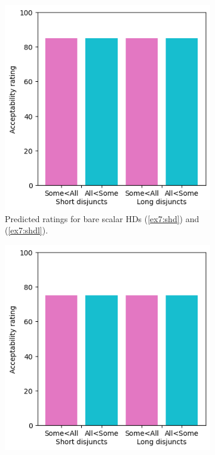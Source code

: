 \begin{figure}[H]
	\centering
	\begin{subfigure}[t]{.32\linewidth}
		\centering
		\includegraphics[width=\linewidth]{./pred-1a-noonly.png}
		\caption[]{Predicted ratings for bare scalar HDs (\ref{ex7:shd}) and (\ref{ex7:shdl}).}
	\end{subfigure}
	\hfill
	\begin{subfigure}[t]{.32\linewidth}
		\centering
		\includegraphics[width=\linewidth]{./pred-1a-only.png}

\end{subfigure}
\end{figure}

